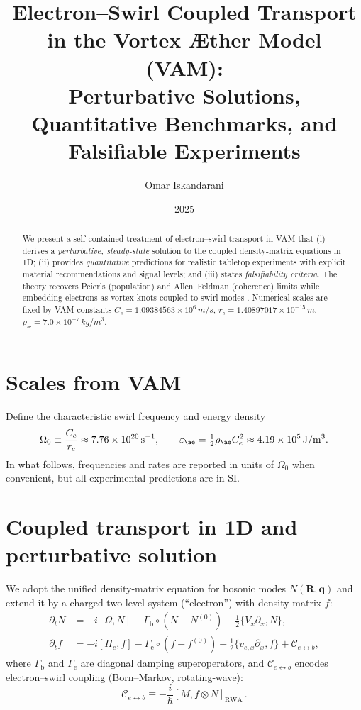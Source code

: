 \documentclass[12pt]{article}
\title{Electron--Swirl Coupled Transport in the Vortex \AE ther Model (VAM):\\
Perturbative Solutions, Quantitative Benchmarks, and Falsifiable Experiments}
\author{Omar Iskandarani}
\date{2025}
\newcommand{\CeVal}{1.09384563\times10^{6}} %
\newcommand{\rcVal}{1.40897017\times10^{-15}} %
\newcommand{\rhoaVal}{7.0\times10^{-7}} %
\newcommand{\Ce}{C_e}
\newcommand{\rc}{r_c}
\newcommand{\rhoa}{\rho_{\text{\ae}}}
\begin{document}
\maketitle


\begin{abstract}
We present a self-contained treatment of electron--swirl transport in VAM that (i) derives a \emph{perturbative, steady-state} solution to the coupled density-matrix equations in 1D; (ii) provides \emph{quantitative} predictions for realistic tabletop experiments with explicit material recommendations and signal levels; and (iii) states \emph{falsifiability criteria}. The theory recovers Peierls (population) and Allen--Feldman (coherence) limits \cite{Peierls1929,AllenFeldman1993,Simoncelli2019Unified} while embedding electrons as vortex-knots coupled to swirl modes \cite{Madelung1927,Pati2000}. Numerical scales are fixed by VAM constants $\Ce=\CeVal\,\si{m/s}$, $\rc=\rcVal\,\si{m}$, $\rhoa=\rhoaVal\,\si{kg/m^3}$.
\end{abstract}


\section{Scales from VAM}
Define the characteristic swirl frequency and energy density
\begin{align}
\Omega_0 \equiv \frac{\Ce}{\rc} \approx 7.76\times10^{20}\,\si{s^{-1}},\qquad
\varepsilon_{\ae} = \tfrac12\rhoa\Ce^2 \approx 4.19\times10^{5}\,\si{J/m^3}.
\end{align}
In what follows, frequencies and rates are reported in units of $\Omega_0$ when convenient, but all experimental predictions are in SI.


\section{Coupled transport in 1D and perturbative solution}
We adopt the unified density-matrix equation for bosonic modes $N(\mathbf R,\mathbf q)$ \cite{Simoncelli2019Unified} and extend it by a charged two-level system (``electron'') with density matrix $f$:
\begin{align}
\partial_t N &= -i[\Omega,N] - \Gamma_\mathrm{b} \circ (N-N^{(0)}) - \tfrac12\{ V_x \partial_x, N\},\label{eq:Ndyn}\\
\partial_t f &= -i[H_e,f] - \Gamma_\mathrm{e}\circ(f-f^{(0)}) - \tfrac12\{ v_{e,x}\partial_x, f\} + \mathcal C_{e\leftrightarrow b},\label{eq:fdyn}
\end{align}
where $\Gamma_\mathrm{b}$ and $\Gamma_\mathrm{e}$ are diagonal damping superoperators, and $\mathcal C_{e\leftrightarrow b}$ encodes electron--swirl coupling (Born--Markov, rotating-wave):
\begin{equation}
\mathcal C_{e\leftrightarrow b} \equiv -\frac{i}{\hbar}[M, f\otimes N]_{\mathrm{RWA}}\,.
\end{equation}
\end{document}
